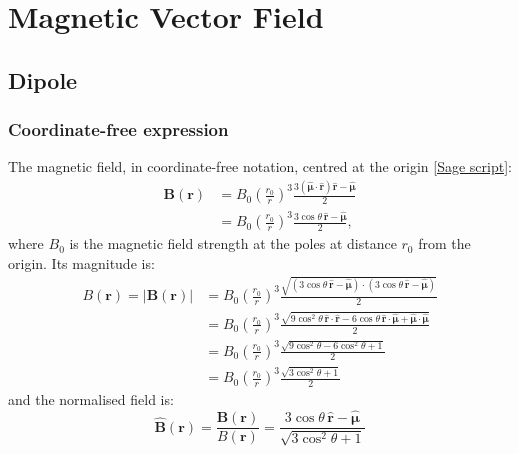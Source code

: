 \documentclass{book}
\newcommand{\unitvec}[1]{\hat{\bm{#1}}}
\newcommand{\linktosage}[1]{\hyperref[#1]{[Sage script]}}
\begin{document}
\section{Magnetic Vector Field}

\subsection{Dipole}

\subsubsection{Coordinate-free expression}

The magnetic field, in coordinate-free notation, centred at the origin \linktosage{sage:Bdip}:
\begin{equation}
    \begin{aligned}
        \bm{B}(\bm{r})
            &= B_0\left(\frac{r_0}{r}\right)^3\frac{3(\unitvec{\mu}\cdot\unitvec{r})\unitvec{r} - \unitvec{\mu}}{2} \\
            &= B_0\left(\frac{r_0}{r}\right)^3\frac{3\cos\theta\,\unitvec{r} - \unitvec{\mu}}{2},
    \end{aligned}
\end{equation}
where $B_0$ is the magnetic field strength at the poles at distance $r_0$ from the origin.
Its magnitude is:
\begin{equation}
\begin{aligned}
    B({\bm{r}}) = |\bm{B}(\bm{r})|
        &= B_0\left(\frac{r_0}{r}\right)^3 \frac{\sqrt{(3\cos\theta\,\unitvec{r} - \unitvec{\mu}) \cdot (3\cos\theta\,\unitvec{r} - \unitvec{\mu}) }}{2} \\
        &= B_0\left(\frac{r_0}{r}\right)^3 \frac{\sqrt{ 9\cos^2\theta\,\unitvec{r}\cdot\unitvec{r} - 6\cos\theta\,\unitvec{r}\cdot\unitvec{\mu} + \unitvec{\mu}\cdot\unitvec{\mu} }}{2} \\
        &= B_0\left(\frac{r_0}{r}\right)^3 \frac{\sqrt{ 9\cos^2\theta - 6\cos^2\theta + 1 }}{2} \\
        &= B_0\left(\frac{r_0}{r}\right)^3 \frac{\sqrt{3\cos^2\theta + 1}}{2}
\end{aligned}
\end{equation}
and the normalised field is:
\begin{equation}
    \unitvec{B}(\bm{r})
        = \frac{\bm{B}(\bm{r})}{B(\bm{r})}
        = \frac{3\cos\theta \, \unitvec{r} - \unitvec{\mu}}{\sqrt{3\cos^2\theta + 1}}
\end{equation}
\end{document}
